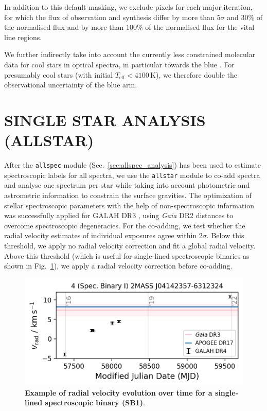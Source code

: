 \documentclass[
  journal=pasa,
  manuscript=research-paper, %
  year=2024,
  volume=37
]{cup-journal}
\newcommand{\Gaia}{\textit{Gaia}\xspace}
\begin{document}
In addition to this default masking, we exclude pixels for each major iteration, for which the flux of observation and synthesis differ by more than $5 \sigma$ and 30\% of the normalised flux and by more than 100\% of the normalised flux for the vital line regions.

We further indirectly take into account the currently less constrained molecular data for cool stars in optical spectra, in particular towards the blue \citep[e.g.][]{Rains2021,Rains2024}. For presumably cool stars (with initial $T_\text{eff} < 4100\,\mathrm{K}$), we therefore double the observational uncertainty of the blue arm.

\section{SINGLE STAR ANALYSIS (ALLSTAR)}
\label{sec:allstar_analysis}

After the \texttt{allspec} module (Sec.~\ref{sec:allspec_analysis}) has been used to estimate spectroscopic labels for all spectra, we use the \texttt{allstar} module to co-add spectra and analyse one spectrum per star while taking into account photometric and astrometric information to constrain the surface gravities. The optimization of stellar spectroscopic parameters with the help of non-spectroscopic information was successfully applied for GALAH DR3 \citep{Buder2021}, using \Gaia DR2 distances \citep{BailerJones2018} to overcome spectroscopic degeneracies. For the co-adding, we test whether the radial velocity estimates of individual exposures agree within $2\sigma$. Below this threshold, we apply no radial velocity correction and fit a global radial velocity. Above this threshold (which is useful for single-lined spectroscopic binaries as shown in Fig.~\ref{fig:examples_flag_sp_2}), we apply a radial velocity correction before co-adding.

\begin{figure}[ht]
 \centering
 \includegraphics[width=\textwidth]{figures/examples_flag_sp_2.png}
 \caption{\textbf{Example of radial velocity evolution over time for a single-lined spectroscopic binary (SB1)}.}
 \label{fig:examples_flag_sp_2}
\end{figure}
\end{document}

